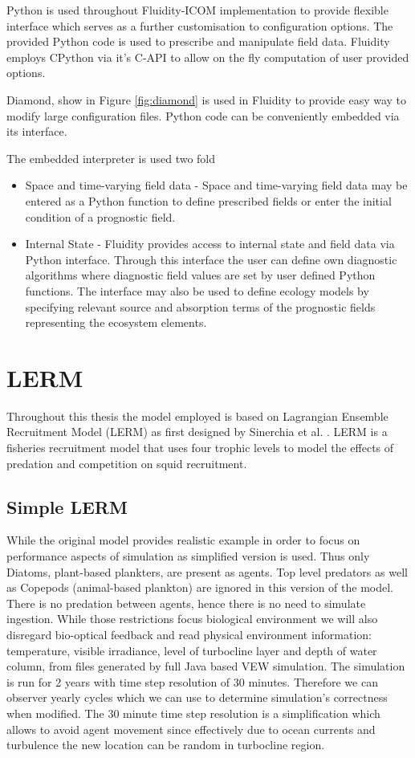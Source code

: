 \documentclass[12pt, a4paper]{report}
\begin{document}
Python is used throughout Fluidity-ICOM implementation to provide flexible
interface which serves as a further customisation to configuration options.
The provided Python code is used to prescribe and manipulate field data.
Fluidity employs CPython via it's C-API to allow on the fly computation
of user provided options.

Diamond, show in Figure \ref{fig:diamond} is used in Fluidity to provide easy way to modify large
configuration files. Python code can be conveniently embedded via its
interface.

The embedded interpreter is used two fold
\begin{itemize}
  \item Space and time-varying field data - Space and time-varying field
data may be entered as a Python function to define prescribed fields
or enter the initial condition of a prognostic field.
  \item Internal State - Fluidity provides access to internal state
  and field data via Python interface. Through this interface
  the user can define own diagnostic algorithms where diagnostic
  field values are set by user defined Python functions. The interface
  may also be used to define ecology models by specifying relevant
  source and absorption terms of the prognostic fields representing
  the ecosystem elements.
\end{itemize}

\section{LERM}\label{sec:lerm}
Throughout this thesis the model employed is based on
Lagrangian Ensemble Recruitment Model (LERM) as first designed
by Sinerchia et al. \cite{FisheriesRecruitment}. LERM is a
fisheries recruitment model that uses four trophic levels to
model the effects of predation and competition on squid recruitment.

\subsection{Simple LERM}\label{subsec:lerm-simp}
While the original model provides realistic example in order
to focus on performance aspects of simulation as simplified version
is used. Thus only Diatoms, plant-based plankters, are present
as agents. Top level predators as well as Copepods (animal-based plankton)
are ignored in this version of the model. There is no predation
between agents, hence there is no need to simulate ingestion.
While those restrictions focus biological environment we will also
disregard bio-optical feedback and read physical environment
information: temperature, visible irradiance, level of turbocline
layer and depth of water column, from files generated by
full Java based VEW simulation. The simulation is run for 2 years
with time step resolution of 30 minutes. Therefore we can observer
yearly cycles which we can use to determine simulation's correctness
when modified. The 30 minute time step resolution is a simplification
which allows to avoid agent movement since effectively due to ocean
currents and turbulence the new location can be random in turbocline
region.
\end{document}
